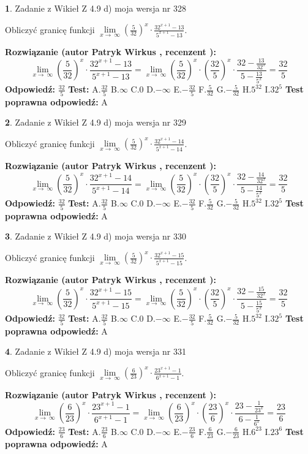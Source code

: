 \documentclass[12pt, a4paper]{article}
\theoremstyle{definition} %
\newtheorem{zad}{}
\newcommand{\zadStart}[1]{\begin{zad}#1\newline}
\newcommand{\zadStop}{\end{zad}}
\newcommand{\rozwStart}[2]{\noindent \textbf{Rozwiązanie (autor #1 , recenzent #2): }\newline}
\newcommand{\rozwStop}{\newline}
\newcommand{\odpStart}{\noindent \textbf{Odpowiedź:}\newline}
\newcommand{\odpStop}{\newline}
\newcommand{\testStart}{\noindent \textbf{Test:}\newline}
\newcommand{\testStop}{\newline}
\newcommand{\kluczStart}{\noindent \textbf{Test poprawna odpowiedź:}\newline}
\newcommand{\kluczStop}{\newline}
\begin{document}
\zadStart{Zadanie z Wikieł Z 4.9 d) moja wersja nr 328}


Obliczyć granicę funkcji  $\lim\limits_{x\to\ \infty}(\frac{5}{32})^{x}\cdot\frac{32^{x+1}-13}{5^{x+1}-13}$.
\zadStop
\rozwStart{Patryk Wirkus}{}
$$\lim\limits_{x\to\ \infty}(\frac{5}{32})^{x}\cdot\frac{32^{x+1}-13}{5^{x+1}-13}=\lim\limits_{x\to\ \infty}(\frac{5}{32})^{x}\cdot(\frac{32}{5})^{x} \cdot \frac{32-\frac{13}{32^{x}}}{5-\frac{13}{5^{x}}} = \frac{32}{5}$$
\rozwStop
\odpStart
$\frac{32}{5}$
\odpStop
\testStart
A.$\frac{32}{5}$ B.$\infty$ C.$0$ D.$-\infty$ E.$-\frac{32}{5}$
F.$\frac{5}{32}$ G.$-\frac{5}{32}$
H.$5^{32}$
I.$32^{5}$
\testStop
\kluczStart
A
\kluczStop



\zadStart{Zadanie z Wikieł Z 4.9 d) moja wersja nr 329}


Obliczyć granicę funkcji  $\lim\limits_{x\to\ \infty}(\frac{5}{32})^{x}\cdot\frac{32^{x+1}-14}{5^{x+1}-14}$.
\zadStop
\rozwStart{Patryk Wirkus}{}
$$\lim\limits_{x\to\ \infty}(\frac{5}{32})^{x}\cdot\frac{32^{x+1}-14}{5^{x+1}-14}=\lim\limits_{x\to\ \infty}(\frac{5}{32})^{x}\cdot(\frac{32}{5})^{x} \cdot \frac{32-\frac{14}{32^{x}}}{5-\frac{14}{5^{x}}} = \frac{32}{5}$$
\rozwStop
\odpStart
$\frac{32}{5}$
\odpStop
\testStart
A.$\frac{32}{5}$ B.$\infty$ C.$0$ D.$-\infty$ E.$-\frac{32}{5}$
F.$\frac{5}{32}$ G.$-\frac{5}{32}$
H.$5^{32}$
I.$32^{5}$
\testStop
\kluczStart
A
\kluczStop



\zadStart{Zadanie z Wikieł Z 4.9 d) moja wersja nr 330}


Obliczyć granicę funkcji  $\lim\limits_{x\to\ \infty}(\frac{5}{32})^{x}\cdot\frac{32^{x+1}-15}{5^{x+1}-15}$.
\zadStop
\rozwStart{Patryk Wirkus}{}
$$\lim\limits_{x\to\ \infty}(\frac{5}{32})^{x}\cdot\frac{32^{x+1}-15}{5^{x+1}-15}=\lim\limits_{x\to\ \infty}(\frac{5}{32})^{x}\cdot(\frac{32}{5})^{x} \cdot \frac{32-\frac{15}{32^{x}}}{5-\frac{15}{5^{x}}} = \frac{32}{5}$$
\rozwStop
\odpStart
$\frac{32}{5}$
\odpStop
\testStart
A.$\frac{32}{5}$ B.$\infty$ C.$0$ D.$-\infty$ E.$-\frac{32}{5}$
F.$\frac{5}{32}$ G.$-\frac{5}{32}$
H.$5^{32}$
I.$32^{5}$
\testStop
\kluczStart
A
\kluczStop



\zadStart{Zadanie z Wikieł Z 4.9 d) moja wersja nr 331}


Obliczyć granicę funkcji  $\lim\limits_{x\to\ \infty}(\frac{6}{23})^{x}\cdot\frac{23^{x+1}-1}{6^{x+1}-1}$.
\zadStop
\rozwStart{Patryk Wirkus}{}
$$\lim\limits_{x\to\ \infty}(\frac{6}{23})^{x}\cdot\frac{23^{x+1}-1}{6^{x+1}-1}=\lim\limits_{x\to\ \infty}(\frac{6}{23})^{x}\cdot(\frac{23}{6})^{x} \cdot \frac{23-\frac{1}{23^{x}}}{6-\frac{1}{6^{x}}} = \frac{23}{6}$$
\rozwStop
\odpStart
$\frac{23}{6}$
\odpStop
\testStart
A.$\frac{23}{6}$ B.$\infty$ C.$0$ D.$-\infty$ E.$-\frac{23}{6}$
F.$\frac{6}{23}$ G.$-\frac{6}{23}$
H.$6^{23}$
I.$23^{6}$
\testStop
\kluczStart
A
\kluczStop
\end{document}
